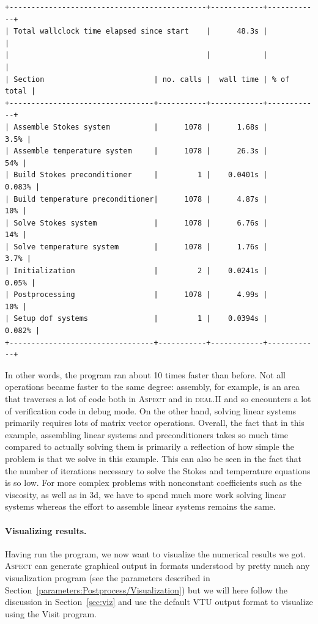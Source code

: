 \documentclass{article}
\newcommand{\dealii}{{\textsc{deal.II}}}
\newcommand{\aspect}{\textsc{Aspect}}
\begin{document}
\begin{lstlisting}[frame=single,language=ksh]
+---------------------------------------------+------------+------------+
| Total wallclock time elapsed since start    |      48.3s |            |
|                                             |            |            |
| Section                         | no. calls |  wall time | % of total |
+---------------------------------+-----------+------------+------------+
| Assemble Stokes system          |      1078 |      1.68s |       3.5% |
| Assemble temperature system     |      1078 |      26.3s |        54% |
| Build Stokes preconditioner     |         1 |    0.0401s |     0.083% |
| Build temperature preconditioner|      1078 |      4.87s |        10% |
| Solve Stokes system             |      1078 |      6.76s |        14% |
| Solve temperature system        |      1078 |      1.76s |       3.7% |
| Initialization                  |         2 |    0.0241s |      0.05% |
| Postprocessing                  |      1078 |      4.99s |        10% |
| Setup dof systems               |         1 |    0.0394s |     0.082% |
+---------------------------------+-----------+------------+------------+
\end{lstlisting}

In other words, the program ran about 10 times faster than before. Not all
operations became faster to the same degree: assembly, for example, is an area
that traverses a lot of code both in \aspect{} and in \dealii{} and so
encounters a lot of verification code in debug mode. On the other hand, solving
linear systems primarily requires lots of matrix vector operations. Overall, the
fact that in this example, assembling linear systems and preconditioners takes
so much time compared to actually solving them is primarily a reflection of how
simple the problem is that we solve in this example. This can also be seen in
the fact that the number of iterations necessary to solve the Stokes and
temperature equations is so low. For more complex problems with nonconstant
coefficients such as the viscosity, as well as in 3d, we have to spend much more
work solving linear systems whereas the effort to assemble linear systems
remains the same.

\paragraph{Visualizing results.}
Having run the program, we now want to visualize the numerical results we got.
\aspect{} can generate graphical output in formats understood by pretty much any
visualization program (see the parameters described in
Section~\ref{parameters:Postprocess/Visualization}) but we will here follow the
discussion in Section~\ref{sec:viz} and use the default VTU output format to
visualize using the Visit program.
\end{document}
